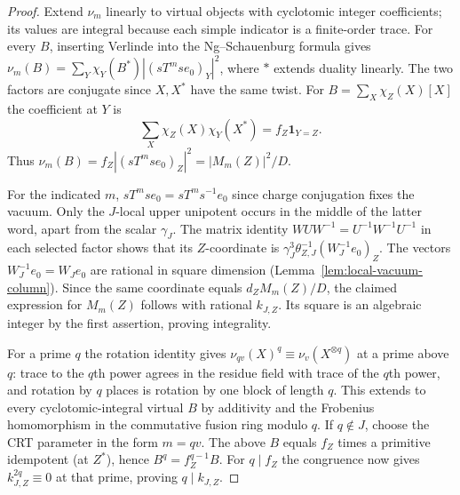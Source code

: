 \documentclass[11pt,a4paper]{article}
\numberwithin{equation}{section}
\theoremstyle{remark}
\begin{document}
\begin{proof}
Extend $\nu_m$ linearly to virtual objects with cyclotomic integer coefficients; its values are integral because each simple indicator is a finite-order trace. For every $B$, inserting Verlinde into the Ng--Schauenburg formula \cite[Theorem~7.5 and Remark~7.6]{NSfs} gives $\nu_m(B)=\sum_Y\chi_Y(B^*)|(sT^ms e_0)_Y|^2$, where $*$ extends duality linearly. The two factors are conjugate since $X,X^*$ have the same twist. For $B=\sum_X\chi_Z(X)[X]$ the coefficient at $Y$ is
\[
              \sum_X\chi_Z(X)\chi_Y(X^*)=f_Z\mathbf1_{Y=Z}.
\]
Thus $\nu_m(B)=f_Z|(sT^ms e_0)_Z|^2=|M_m(Z)|^2/D$.

For the indicated $m$, $sT^m s e_0=sT^m s^{-1}e_0$ since charge conjugation fixes the vacuum. Only the $J$-local upper unipotent occurs in the middle of the latter word, apart from the scalar $\gamma_J$. The matrix identity $W U W^{-1}=U^{-1}W^{-1}U^{-1}$ in each selected factor shows that its $Z$-coordinate is $\gamma_J^3\theta_{Z,J}^{-1}(W_J^{-1}e_0)_Z$. The vectors $W_J^{-1}e_0=W_J e_0$ are rational in square dimension (Lemma~\ref{lem:local-vacuum-column}). Since the same coordinate equals $d_Z M_m(Z)/D$, the claimed expression for $M_m(Z)$ follows with rational $k_{J,Z}$. Its square is an algebraic integer by the first assertion, proving integrality.

For a prime $q$ the rotation identity \cite[(5.4) and proof of Theorem~5.1, pp.~75--76]{NSpivot} gives
$\nu_{qv}(X)^q\equiv\nu_v(X^{\otimes q})$ at a prime above $q$: trace to the $q$th power agrees in the residue field with trace of the $q$th power, and rotation by $q$ places is rotation by one block of length $q$. This extends to every cyclotomic-integral virtual $B$ by additivity and the Frobenius homomorphism in the commutative fusion ring modulo $q$. If $q\notin J$, choose the CRT parameter in the form $m=qv$. The above $B$ equals $f_Z$ times a primitive idempotent (at $Z^*$), hence $B^q=f_Z^{q-1}B$. For $q\mid f_Z$ the congruence now gives $k_{J,Z}^{2q}\equiv0$ at that prime, proving $q\mid k_{J,Z}$.
\end{proof}
\end{document}
